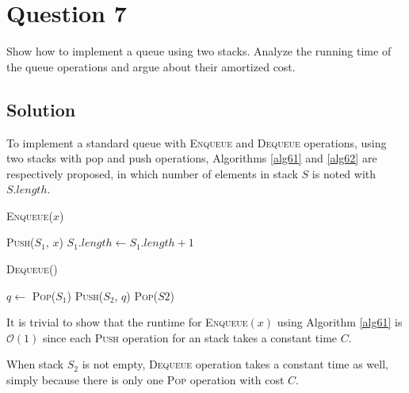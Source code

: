 
\section*{Question 7}

Show how to implement a queue using two stacks. Analyze the running time of the queue operations and argue about their amortized cost.

\subsection*{Solution}
To implement a standard queue with \textsc{Enqueue} and \textsc{Dequeue} operations, using two stacks with pop and push operations, Algorithms \ref{alg61} and \ref{alg62} are respectively proposed, in which number of elements in stack $S$ is noted with $S.length$.

\begin{algorithm}[H]
\caption{\textsc{Enqueue($x$)}}\label{alg61}
\begin{algorithmic}[1]
\State \textsc{Push($S_1$, $x$)}
\State $S_1.length \leftarrow S_1.length + 1$
\end{algorithmic}
\end{algorithm}

\begin{algorithm}[H]
\caption{\textsc{Dequeue()}}\label{alg62}
\begin{algorithmic}[1]
\State $q \leftarrow$ \textsc{Pop}($S_1$)
\State \textsc{Push}($S_2$, $q$)
\EndFor
\EndIf
\State \Return \textsc{Pop}($S2$)
\end{algorithmic}
\end{algorithm}

It is trivial to show that the runtime for \textsc{Enqueue}$(x)$ using Algorithm \ref{alg61} is $\mathcal{O}(1)$ since each \textsc{Push} operation for an stack takes a constant time $C$.

When stack $S_2$ is not empty, \textsc{Dequeue} operation takes a constant time as well, simply because there is only one \textsc{Pop} operation with cost $C$.

